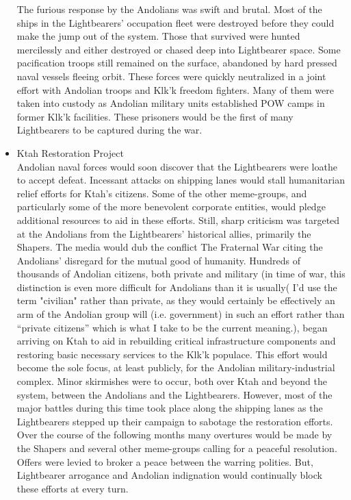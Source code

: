 \begin{itemize}
The furious response by the Andolians was swift and brutal.  Most of
the ships in the Lightbearers' occupation fleet were destroyed before
they could make the jump out of the system.  Those that survived were
hunted mercilessly and either destroyed or chased deep into
Lightbearer space.  Some pacification troops still remained on the
surface, abandoned by hard pressed naval vessels fleeing orbit.  These
forces were quickly neutralized in a joint effort with Andolian troops
and Klk'k freedom fighters.  Many of them were taken into custody as
Andolian military units established POW camps in former Klk'k
facilities.  These prisoners would be the first of many Lightbearers
to be captured during the war.

\item Ktah Restoration Project \\

Andolian naval forces would soon discover that the Lightbearers were
loathe to accept defeat.  Incessant attacks on shipping lanes would
stall humanitarian relief efforts for Ktah's citizens.  Some of the
other meme-groups, and particularly some of the more benevolent
corporate entities, would pledge additional resources to aid in these
efforts.  Still, sharp criticism was targeted at the Andolians from
the Lightbearers' historical allies, primarily the Shapers.  The media
would dub the conflict The Fraternal War citing the Andolians'
disregard for the mutual good of humanity.  Hundreds of thousands of
Andolian citizens, both private and military (in time of war, this
distinction is even more difficult for Andolians than it is usually( I'd use the term "civilian" rather than private, as they would
certainly be effectively an arm of the Andolian group will
(i.e. government) in such an effort rather than ``private citizens''
which is what I take to be the current meaning.), began arriving on
Ktah to aid in rebuilding critical infrastructure components and
restoring basic necessary services to the Klk'k populace.  This effort
would become the sole focus, at least publicly, for the Andolian
military-industrial complex.  Minor skirmishes were to occur, both
over Ktah and beyond the system, between the Andolians and the
Lightbearers.  However, most of the major battles during this time
took place along the shipping lanes as the Lightbearers stepped up
their campaign to sabotage the restoration efforts.  Over the course
of the following months many overtures would be made by the Shapers
and several other meme-groups calling for a peaceful resolution.
Offers were levied to broker a peace between the warring polities.
But, Lightbearer arrogance and Andolian indignation would continually
block these efforts at every turn.


\end{itemize}
